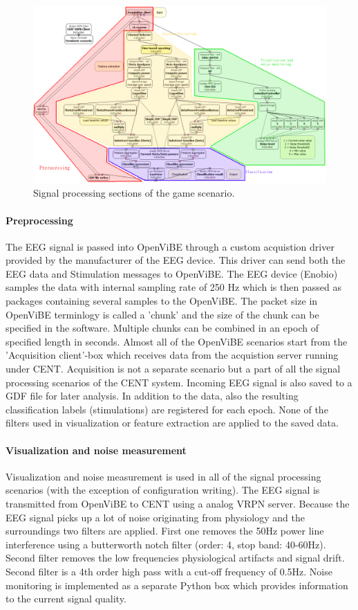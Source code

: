 \begin{figure}[h]
	\centering
	\includegraphics[scale=0.3]{sections.png}
	\caption{Signal processing sections of the game scenario.}\label{processingsections}
\end{figure}

\paragraph{Preprocessing}
The EEG signal is passed into OpenViBE through a custom acquistion driver provided by the manufacturer of the EEG device. This driver can send both the EEG data and Stimulation messages to OpenViBE. The EEG device (Enobio) samples the data with internal sampling rate of 250 Hz which is then passed as packages containing several samples to the OpenViBE. The packet size in OpenViBE terminlogy is called a 'chunk' and the size of the chunk can be specified in the software. Multiple chunks can be combined in an epoch of specified length in seconds. Almost all of the OpenViBE scenarios start from the 'Acquisition client'-box which receives data from the acquistion server running under CENT. Acquisition is not a separate scenario but a part of all the signal processing scenarios of the CENT system. Incoming EEG signal is also saved to a GDF file for later analysis. In addition to the data, also the resulting classification labels (stimulations) are registered for each epoch. None of the filters used in visualization or feature extraction are applied to the saved data.

\paragraph{Visualization and noise measurement}
Visualization and noise measurement is used in all of the signal processing scenarios (with the exception of configuration writing). The EEG signal is transmitted from OpenViBE to CENT using a analog VRPN server. Because the EEG signal picks up a lot of noise originating from physiology and the surroundings two filters are applied. First one removes the 50Hz power line interference using a butterworth notch filter (order: 4, stop band: 40-60Hz). Second filter removes the low frequencies physiological artifacts and signal drift. Second filter is a 4th order high pass with a cut-off frequency of 0.5Hz. Noise monitoring is implemented as a separate Python box which provides information to the current signal quality.

